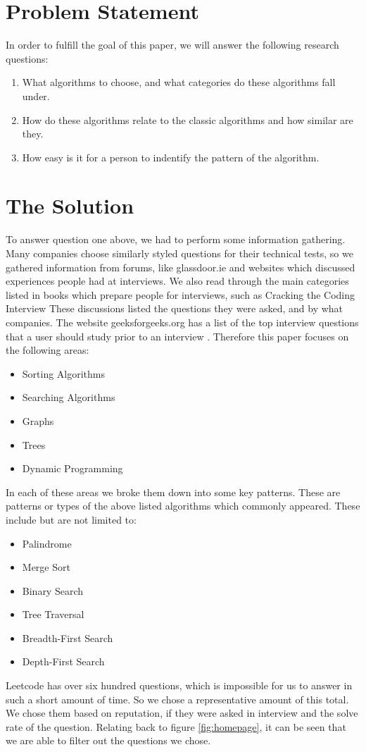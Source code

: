 \documentclass[10pt,twocolumn]{IEEEtran}
\begin{document}
\section{Problem Statement}
In order to fulfill the goal of this paper, we will answer the following research questions:
\begin{enumerate}
\item What algorithms to choose, and what categories do these algorithms fall under. 
\item How do these algorithms relate to the classic algorithms and how similar are they.
\item How easy is it for a person to indentify the pattern of the algorithm.
\end{enumerate}
\section{The Solution}
To answer question one above, we had to perform some information gathering. Many companies choose similarly styled questions for their technical tests, so we gathered information from forums, like glassdoor.ie \cite{glassdoor} and websites which discussed experiences people had at interviews. We also read through the main categories listed in books which prepare people for interviews, such as Cracking the Coding Interview \cite{mcdowell2015cracking} These discussions listed the questions they were asked, and by what companies. The website geeksforgeeks.org has a list of the top interview questions that a user should study prior to an interview \cite{geeksalgos}. Therefore this paper focuses on the following areas:
\begin{itemize}
\item Sorting Algorithms
\item Searching Algorithms
\item Graphs
\item Trees
\item Dynamic Programming
\end{itemize}
In each of these areas we broke them down into some key patterns. These are patterns or types of the above listed algorithms which commonly appeared. These include but are not limited to:
\begin{itemize}
\item Palindrome
\item  Merge Sort
\item Binary Search
\item Tree Traversal
\item Breadth-First Search
\item Depth-First Search
\end{itemize} 
\par Leetcode has over six hundred questions, which is impossible for us to answer in such a short amount of time. So we chose a representative amount of this total. We chose them based on reputation, if they were asked in interview and the solve rate of the question. Relating back to figure \ref{fig:homepage}, it can be seen that we are able to filter out the questions we chose.
\end{document}
